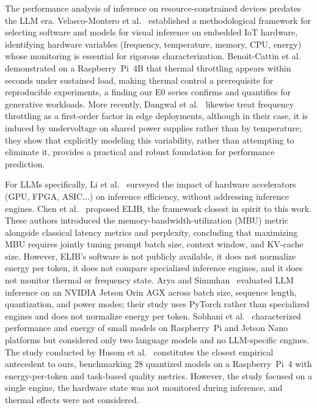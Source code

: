 \documentclass[acmsmall,natbib=false]{acmart}
\begin{document}
The performance analysis of inference on resource-constrained devices
predates the LLM era. Velasco-Montero et
al.~\cite{velasco-montero_optimal_2022,velasco-montero_relevant_2022}
established a methodological framework for selecting software and models for
visual inference on embedded IoT hardware, identifying hardware variables
(frequency, temperature, memory, CPU, energy) whose monitoring is essential
for rigorous characterization. Benoit-Cattin et
al.~\cite{benoit-cattin_impact_2020} demonstrated on a Raspberry~Pi~4B that
thermal throttling appears within seconds under sustained load, making
thermal control a prerequisite for reproducible experiments, a finding our
E0 series confirms and quantifies for generative workloads. More recently,
Dangwal et al.~\cite{dangwal_reliable_2026} likewise treat frequency
throttling as a first-order factor in edge deployments, although in their case, it is
induced by undervoltage on shared power supplies rather than by temperature;
they show that explicitly modeling this variability, rather than attempting to
eliminate it, provides a practical and robust foundation for performance
prediction.

For LLMs specifically, Li et al.~\cite{li_large_2025} surveyed the impact of
hardware accelerators (GPU, FPGA, ASIC...) on inference efficiency, without
addressing inference engines. Chen et al.~\cite{chen_inference_2025} proposed
ELIB, the framework closest in spirit to this work. These authors introduced the
memory-bandwidth-utilization (MBU) metric alongside classical latency metrics
and perplexity, concluding that maximizing MBU requires jointly tuning
prompt batch size, context window, and KV-cache size. However, ELIB's
software is not publicly available, it does not normalize energy per token,
it does not compare specialized inference engines, and it does not monitor
thermal or frequency state. Arya and Simmhan~\cite{11105796} evaluated LLM
inference on an NVIDIA Jetson Orin AGX across batch size, sequence length,
quantization, and power modes; their study uses
PyTorch rather than specialized engines and does not normalize energy per
token. Sobhani et al.~\cite{sobhani_sustainability_2025} characterized
performance and energy of small models on Raspberry~Pi and Jetson Nano
platforms but considered only two language models and no LLM-specific engines.
The study conducted by Husom et al.~\cite{husom_sustainable_2025} constitutes the closest empirical
antecedent to ours, benchmarking 28 quantized models on a Raspberry~Pi~4 with
energy-per-token and task-based quality metrics. However, the study focused on a
single engine, the hardware state was not monitored during inference, and thermal effects were not considered.
\end{document}
